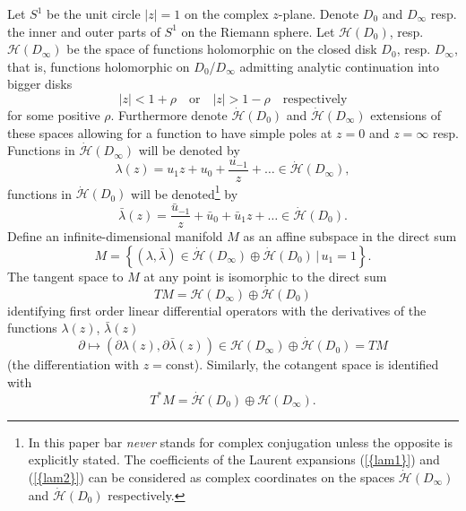 \documentclass[numbook, envcountsame, envcountreset]{svjour3}
\begin{document}
Let $S^1$ be the unit circle $|z|=1$ on the complex $z$-plane. Denote $D_0$ and $D_\infty$ resp. the inner and outer parts of $S^1$ on the Riemann sphere. Let ${\mathcal H}(D_0)$, resp. ${\mathcal H}(D_\infty)$ be the space of functions holomorphic on the closed disk $D_0$, resp. $D_\infty$, that is, functions holomorphic on $D_0$/$D_\infty$ admitting analytic continuation into bigger disks
$$
|z|<1+\rho\quad \mbox{or} \quad |z|>1-\rho\quad \mbox{respectively}
$$
for some positive $\rho$. 
Furthermore denote $\dot{\mathcal H}(D_0)$ and $\dot{\mathcal H}(D_\infty)$ extensions of these spaces allowing for a function to have simple poles at $z=0$ and $z=\infty$ resp. Functions in $\dot{\mathcal H}(D_\infty)$ will be denoted by
\begin{equation}\label{lam1}
\lambda(z) = u_1 z + u_0 + \frac{u_{-1}}{z}+\dots\in \dot{\mathcal H}(D_\infty),
\end{equation}
functions in $\dot{\mathcal H}(D_0)$ will be denoted\footnote{In this paper bar {\it never} stands for complex conjugation unless the opposite is explicitly stated. The coefficients of the Laurent expansions {(\ref{{lam1}})} and {(\ref{{lam2}})} can be considered as complex coordinates on the spaces $\dot{\mathcal H}(D_\infty)$ and $\dot{\mathcal H}(D_0)$ respectively.} by
\begin{equation}\label{lam2}
\bar\lambda(z) = \frac{\bar u_{-1}}{z} + \bar u_0 + \bar u_1 z +\dots \in \dot{\mathcal H}(D_0).
\end{equation}
Define an infinite-dimensional manifold $M$ as an affine subspace in the direct sum
\begin{equation}\label{mani}
M=\left\{ (\lambda, \bar\lambda)\in \dot{\mathcal H}(D_\infty)\oplus \dot{\mathcal H}(D_0)\, | \, u_1=1\right\}.
\end{equation}
The tangent space to $M$ at any point is isomorphic to the direct sum
\begin{equation}\label{tan}
TM=  {\mathcal H}(D_\infty) \oplus \dot{\mathcal H}(D_0)
\end{equation}
identifying first order linear differential operators with the derivatives of the functions $\lambda(z)$, $\bar\lambda(z)$
\begin{equation}\label{doper}
{\partial} \mapsto ({\partial} \lambda(z), {\partial}\bar\lambda(z))\in  {\mathcal H}(D_\infty) \oplus \dot{\mathcal H}(D_0) = TM
\end{equation}
(the differentiation with $z=\mbox{const}$). Similarly, the cotangent space is identified with
\begin{equation}\label{cotan}
T^*M =\dot{\mathcal H}(D_0) \oplus {\mathcal H}(D_\infty).
\end{equation}
\end{document}

